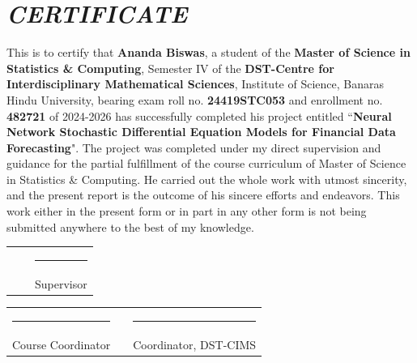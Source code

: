 \vspace*{3em}
\section*{\centering \Large \textit{CERTIFICATE}}
\vspace{3em}
\hspace*{1cm}This is to certify that \textbf{Ananda Biswas}, a student of the \textbf{Master of Science in Statistics \& Computing}, Semester IV of the \textbf{DST-Centre for Interdisciplinary Mathematical Sciences}, Institute of Science, Banaras Hindu University, bearing exam roll no. \textbf{24419STC053} and enrollment no. \textbf{482721} of 2024-2026 has successfully completed his  project entitled ``\textbf{Neural Network Stochastic Differential Equation Models for Financial Data Forecasting}". The project was completed under my direct supervision and guidance for the partial fulfillment of the course curriculum of Master of Science in Statistics \& Computing. He carried out the whole work with utmost sincerity, and the present report is the outcome of his sincere efforts and endeavors. This work either in the present form or in part in any other form is not being submitted anywhere to the best of my knowledge.

\vspace*{5em}
\begin{center}
\begin{tabularx}{\linewidth}{XXX}
    & & \centering\rule[.1em]{11em}{1pt} \tabularnewline
    & & \centering Supervisor \tabularnewline
\end{tabularx}
\vspace{5em}

\begin{tabularx}{\linewidth}{XXX}
    \centering\rule[.1em]{11em}{1pt} & & \centering\rule[.1em]{11em}{1pt} \tabularnewline
    \centering Course Coordinator & & \centering Coordinator, DST-CIMS \tabularnewline
\end{tabularx}
\end{center}
\clearpage
